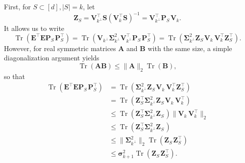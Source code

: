 \documentclass[twoside,11pt]{book}
\numberwithin{theorem}{chapter}
\numberwithin{definition}{chapter}
\numberwithin{proposition}{chapter}
\numberwithin{corollary}{chapter}
\numberwithin{example}{chapter}
\numberwithin{lemma}{chapter}
\numberwithin{assumption}{chapter}
\numberwithin{equation}{chapter}
\numberwithin{figure}{chapter}
\DeclareMathOperator{\Tr}{Tr}
\DeclareMathOperator{\Tran}{\intercal}
\begin{document}
First, for $S \subset [d], |S| =k$, let
$$
\bm{Z}_{S} = \bm{V}_{k^{\perp}}^{\Tran} \bm{S}(\bm{V}_{k}^{\Tran}\bm{S})^{-1} = \bm{V}_{k^{\perp}}^{\Tran} \bm{P}_{S}^{\phantom{\Tran}} \bm{V}_{k}.
$$
It allows us to write
\begin{equation}
	\Tr(\bm{E}^{\Tran}\bm{E}\bm{P}^{\phantom{\Tran}}_{S}\bm{P}^{\Tran}_{S})= \Tr(\bm{V}_{k^{\perp}}\bm{\Sigma}_{k^{\perp}}		^{2}\bm{V}_{k^{\perp}}^{\Tran}\bm{P}^{\phantom{\Tran}}_{S}\bm{P}^{\Tran}_{S}) = \Tr(\bm{\Sigma}_{k^{\perp}}^{2}\bm{Z}_{S}^{\phantom{\Tran}}\bm{V}_{k}^{\phantom{\Tran}}\bm{V}_{k}^{\Tran}\bm{Z}_{S}^{\Tran}).
\end{equation}
However, for real symmetric matrices $\bm{A}$ and $\bm{B}$ with the same size, a simple diagonalization argument yields
\begin{equation}
	\Tr(\bm{A}\bm{B}) \leq \|\bm{A}\|_{2}\Tr(\bm{B}),
\end{equation}
so that
\begin{align}\label{eq:majoration_by_sigma_k_1}
\Tr(\bm{E}^{\Tran}\bm{E}\bm{P}^{\phantom{\Tran}}_{S}\bm{P}^{\Tran}_{S}) & = \Tr(\bm{\Sigma}_{k^{\perp}}^{2}\bm{Z}_{S}^{\phantom{\Tran}}\bm{V}_{k}^{\phantom{\Tran}}\bm{V}_{k}^{\Tran}\bm{Z}_{S}^{\Tran}) \nonumber\\
& = \Tr(\bm{Z}_{S}^{\Tran}\bm{\Sigma}_{k^{\perp}}^{2}\bm{Z}_{S}^{\phantom{\Tran}}\bm{V}_{k}^{\phantom{\Tran}}\bm{V}_{k}^{\Tran}) \nonumber\\
& \leq \Tr(\bm{Z}_{S}^{\Tran}\bm{\Sigma}_{k^{\perp}}^{2}\bm{Z}_{S}^{\phantom{\Tran}}) \|\bm{V}_{k}^{\phantom{\Tran}}\bm{V}_{k}^{\Tran}\|_{2} \nonumber\\
& \leq \Tr(\bm{Z}_{S}^{\Tran}\bm{\Sigma}_{k^{\perp}}^{2}\bm{Z}_{S}^{\phantom{\Tran}}) \nonumber \\
& \leq \|\bm{\Sigma}_{k^{\perp}}^{2}\|_{2}\Tr(\bm{Z}_{S}^{\phantom{\Tran}}\bm{Z}_{S}^{\Tran}) \nonumber \\
& \leq \bm{\sigma}_{k+1}^{2} \Tr(\bm{Z}_{S}^{\phantom{\Tran}}\bm{Z}_{S}^{\Tran}).
\end{align}
\end{document}
